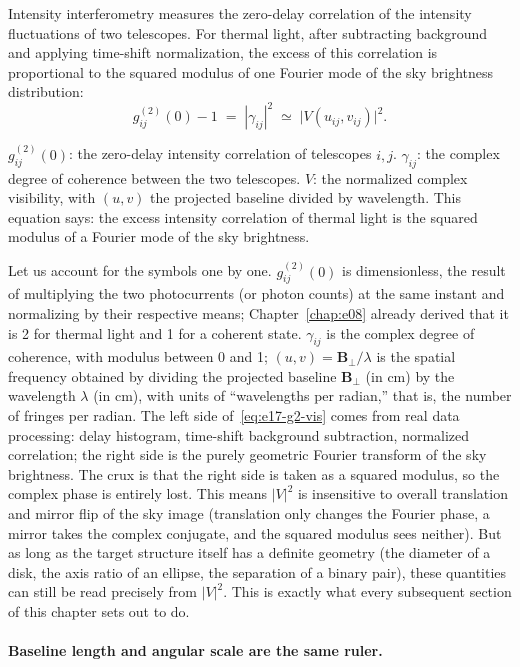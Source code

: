 Intensity interferometry measures the zero-delay correlation of the intensity fluctuations of two telescopes. For thermal light, after subtracting background and applying time-shift normalization, the excess of this correlation is proportional to the squared modulus of one Fourier mode of the sky brightness distribution:
\begin{equation}
  g^{(2)}_{ij}(0)-1 \;=\; |\gamma_{ij}|^2 \;\simeq\; \bigl|V(u_{ij},v_{ij})\bigr|^2 .
  \label{eq:e17-g2-vis}
\end{equation}
\begin{formulaexplain}
\(g^{(2)}_{ij}(0)\): the zero-delay intensity correlation of telescopes \(i,j\). \(\gamma_{ij}\): the complex degree of coherence between the two telescopes. \(V\): the normalized complex visibility, with \((u,v)\) the projected baseline divided by wavelength. This equation says: the excess intensity correlation of thermal light is the squared modulus of a Fourier mode of the sky brightness.
\end{formulaexplain}
Let us account for the symbols one by one. \(g^{(2)}_{ij}(0)\) is dimensionless, the result of multiplying the two photocurrents (or photon counts) at the same instant and normalizing by their respective means; Chapter~\ref{chap:e08} already derived that it is 2 for thermal light and 1 for a coherent state. \(\gamma_{ij}\) is the complex degree of coherence, with modulus between 0 and 1; \((u,v)=\bm{B}_\perp/\lambda\) is the spatial frequency obtained by dividing the projected baseline \(\bm{B}_\perp\) (in cm) by the wavelength \(\lambda\) (in cm), with units of ``wavelengths per radian,'' that is, the number of fringes per radian. The left side of~\eqref{eq:e17-g2-vis} comes from real data processing: delay histogram, time-shift background subtraction, normalized correlation; the right side is the purely geometric Fourier transform of the sky brightness. The crux is that the right side is taken as a squared modulus, so the complex phase is entirely lost. This means \(|V|^2\) is insensitive to overall translation and mirror flip of the sky image (translation only changes the Fourier phase, a mirror takes the complex conjugate, and the squared modulus sees neither). But as long as the target structure itself has a definite geometry (the diameter of a disk, the axis ratio of an ellipse, the separation of a binary pair), these quantities can still be read precisely from \(|V|^2\). This is exactly what every subsequent section of this chapter sets out to do.

\paragraph{Baseline length and angular scale are the same ruler.}
\label{sec:e17-baseline}

